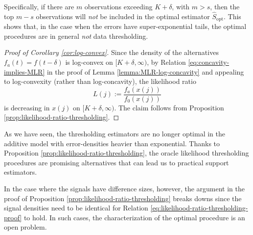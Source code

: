 Specifically, if there are $m$ observations exceeding $K+\delta$, with $m>s$, then the top $m-s$ observations will \emph{not} be included in the optimal estimator $\widehat{S}_{\text{opt}}$. This shows that, in the case when the 
errors have super-exponential tails, the optimal procedures are in general \emph{not} data thresholding.

\begin{proof}[Proof of Corollary \ref{cor:log-convex}]
Since the density of the alternatives $f_{a}(t) = {f(t-\delta)}$ is log-convex on $[K+\delta, \infty)$, by Relation \eqref{eq:concavity-implies-MLR} in the proof of Lemma \ref{lemma:MLR-log-concavity} and appealing to log-convexity (rather than log-concavity), the likelihood ratio
$$
L(j) := \frac{f_a(x(j))}{f_0(x(j))} %
$$
is decreasing in $x(j)$ on $[K+\delta, \infty)$.  The claim follows from Proposition \ref{prop:likelihood-ratio-thresholding}.
\end{proof}

\begin{remark} As we have seen, the thresholding estimators are no longer optimal 
in the additive model with error-densities heavier than exponential.   Thanks to Proposition 
\ref{prop:likelihood-ratio-thresholding}, the oracle likelihood thresholding procedures are promising alternatives
that can lead us to practical support estimators.  

In the case where the signals have difference sizes, however, the argument in the proof of Proposition \ref{prop:likelihood-ratio-thresholding} breaks downs since the signal densities need to be identical for Relation \eqref{eq:likelihood-ratio-thresholding-proof} to hold.  In such cases, the characterization of the optimal procedure is an open problem.
\end{remark}









